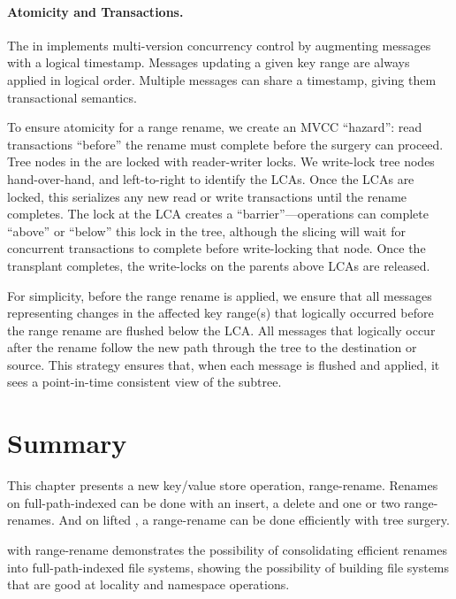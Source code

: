 \paragraph{Atomicity and Transactions.}
The \fti in \betrfs implements \bets multi-version concurrency control by
augmenting messages with a logical timestamp.
Messages updating a given key range are always applied in logical order.
Multiple messages can share a timestamp, giving them transactional semantics.

To ensure atomicity for a range rename, we create an MVCC ``hazard'':
read transactions ``before'' the rename must complete before the surgery
can proceed.
Tree nodes in the \bet are locked with reader-writer locks.
We write-lock tree nodes hand-over-hand, and left-to-right to identify
the LCAs.
Once the LCAs are locked, this serializes any new read or write
transactions until the rename completes.
The lock at the LCA creates a ``barrier''---operations can complete ``above'' or
``below'' this lock in the tree, although the slicing will wait for concurrent
transactions to complete before write-locking that node.
Once the transplant completes, the write-locks on the parents above LCAs are
released.

For simplicity, before the range rename is applied, we ensure that all messages
representing changes in the affected key range(s) that logically occurred before
the range rename are flushed below the LCA.
All messages that logically occur after the rename follow the new path through
the tree to the destination or source.
This strategy ensures that, when each message is flushed and applied, it sees a
point-in-time consistent view of the subtree.

\section{Summary}

This chapter presents a new key/value store operation, range-rename.
Renames on full-path-indexed \betrfs can be done with an insert, a delete and
one or two range-renames.
And on lifted \bets, a range-rename can be done efficiently with tree surgery.

\betrfs with range-rename demonstrates the possibility of consolidating
efficient renames into full-path-indexed file systems, showing the possibility
of building file systems that are good at locality and namespace operations.

